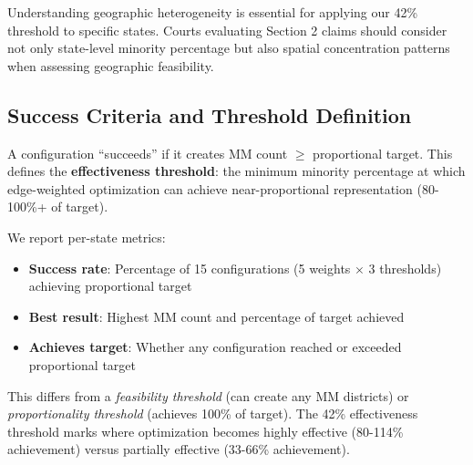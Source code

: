 Understanding geographic heterogeneity is essential for applying our 42\% threshold to specific states. Courts evaluating Section 2 claims should consider not only state-level minority percentage but also spatial concentration patterns when assessing geographic feasibility.

\subsection{Success Criteria and Threshold Definition}

A configuration ``succeeds'' if it creates MM count $\geq$ proportional target. This defines the \textbf{effectiveness threshold}: the minimum minority percentage at which edge-weighted optimization can achieve near-proportional representation (80-100\%+ of target).

We report per-state metrics:
\begin{itemize}
    \item \textbf{Success rate}: Percentage of 15 configurations (5 weights $\times$ 3 thresholds) achieving proportional target
    \item \textbf{Best result}: Highest MM count and percentage of target achieved
    \item \textbf{Achieves target}: Whether any configuration reached or exceeded proportional target
\end{itemize}

This differs from a \textit{feasibility threshold} (can create any MM districts) or \textit{proportionality threshold} (achieves 100\% of target). The 42\% effectiveness threshold marks where optimization becomes highly effective (80-114\% achievement) versus partially effective (33-66\% achievement).
